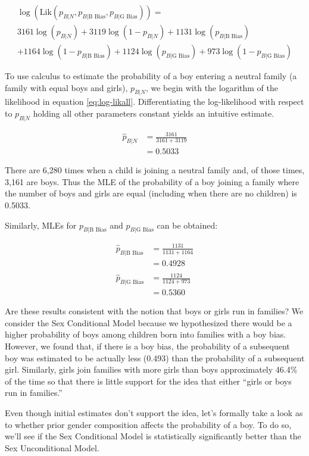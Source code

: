 \documentclass[
]{krantz}
\newcommand{\Lik}{\mathrm{Lik}}
\newcommand{\neutral}{p_{B|N}}
\newcommand{\gbias}{p_{B|\textrm{G Bias}}}
\newcommand{\bbias}{p_{B|\textrm{B Bias}}}
\begin{document}
\begin{multline}
\log(\Lik(\neutral,  \bbias, \gbias)) = \\  
 3161\log(\neutral)+3119\log(1-\neutral)+1131\log(\bbias) \\
 +1164\log(1-\bbias)+1124\log(\gbias)+ 973\log(1-\gbias)
\label{eq:log-likall} 
\end{multline}

To use calculus to estimate the probability of a boy entering a neutral family (a family with equal boys and girls), \(\neutral\), we begin with the logarithm of the likelihood in equation \eqref{eq:log-likall}. Differentiating the log-likelihood with respect to \(\neutral\) holding all other parameters constant yields an intuitive estimate.

\begin{align*}
 \hat{p}_{B|N}&=\frac{3161}{3161+3119} \\
 &=0.5033
\end{align*}

There are 6,280 times when a child is joining a neutral family and, of those times, 3,161 are boys. Thus the MLE of the probability of a boy joining a family where the number of boys and girls are equal (including when there are no children) is 0.5033.

Similarly, MLEs for \(\bbias\) and \(\gbias\) can be obtained:

\begin{align*}
 \hat{p}_{B|\textrm{B Bias}}&= \frac{1131}{1131+1164}\\
 & =  0.4928 \\
 &  \\
 \hat{p}_{B|\textrm{G Bias}}&=\frac{1124}{1124+973}\\
&= 0.5360
\end{align*}

Are these results consistent with the notion that boys or girls run in families? We consider the Sex Conditional Model because we hypothesized there would be a higher probability of boys among children born into families with a boy bias. However, we found that, if there is a boy bias, the probability of a subsequent boy was estimated to be actually less (0.493) than the probability of a subsequent girl. Similarly, girls join families with more girls than boys approximately 46.4\% of the time so that there is little support for the idea that either ``girls or boys run in families.''

Even though initial estimates don't support the idea, let's formally take a look as to whether prior gender composition affects the probability of a boy. To do so, we'll see if the Sex Conditional Model is statistically significantly better than the Sex Unconditional Model.
\end{document}
